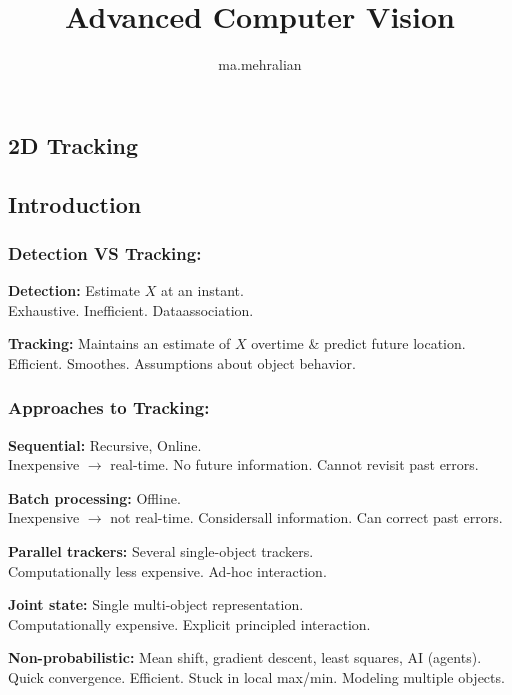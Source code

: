 \documentclass{../cheat}
\title{Advanced Computer Vision}
\author{ma.mehralian}
\begin{document}
\begin{multicols}{3}

\section{2D Tracking}
	\subsection{Introduction}

	\subsubsection{Detection VS Tracking:}
		\textbf{Detection:} Estimate $X$ at an instant.\\
		 Exhaustive.
		 Inefficient.
		 Dataassociation.

		\textbf{Tracking:} Maintains an estimate of $X$ overtime \& predict future location.\\
		 Efficient.
		 Smoothes.
		 Assumptions about object behavior.

	
	\subsubsection{Approaches to Tracking:}
		\textbf{Sequential:} Recursive, Online.\\
		 Inexpensive $\rightarrow$ real-time.
		 No future information.
		 Cannot revisit past errors.
		
		\textbf{Batch processing:} Offline.\\
		 Inexpensive $\rightarrow$ not real-time.
		 Considersall information.
		 Can correct past errors.
		
		
		\textbf{Parallel trackers:}
		Several single-object trackers.\\
		 Computationally less expensive.
		 Ad-hoc interaction.
		
		\textbf{Joint state:}
		Single multi-object representation.\\
		 Computationally expensive.
		 Explicit principled interaction.


		\textbf{Non-probabilistic:} 
		Mean shift, gradient descent, least squares, AI (agents).\\
		 Quick convergence.
		 Efficient.
		 Stuck in local max/min.
		 Modeling multiple objects.


\end{multicols}
\end{document}
